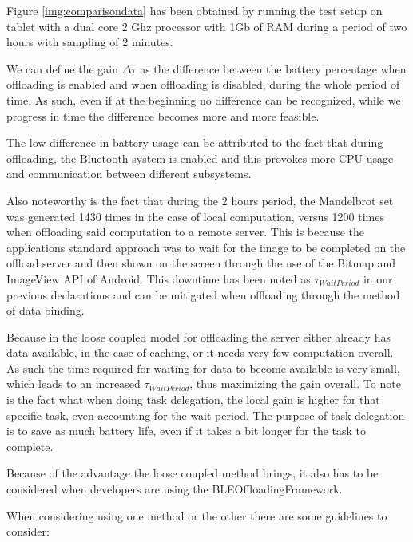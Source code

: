 
Figure \ref{img:comparisondata} has been obtained by running the test setup on tablet with a dual core 2 Ghz processor with 1Gb of RAM during a period of two hours with sampling of 2 minutes.

We can define the gain \(\Delta\tau\) as the difference between the battery percentage when offloading is enabled and when offloading is disabled, during the whole period of time. As such, even if at the beginning no difference can be recognized, while we progress in time the difference becomes more and more feasible.

The low difference in battery usage can be attributed to the fact that during offloading, the Bluetooth system is enabled and this provokes more CPU usage and communication between different subsystems.

Also noteworthy is the fact that during the 2 hours period, the Mandelbrot set was generated 1430 times in the case of local computation, versus 1200 times when offloading said computation to a remote server. This is because the applications standard approach was to wait for the image to be completed on the offload server and then shown on the screen through the use of the Bitmap and ImageView API of Android. This downtime has been noted as \(\tau_{WaitPeriod}\) in our previous declarations and can be mitigated when offloading through the method of data binding.

Because in the loose coupled model for offloading the server either already has data available, in the case of caching, or it needs very few computation overall. As such the time required for waiting for data to become available is very small, which leads to an increased \(\tau_{WaitPeriod}\), thus maximizing the gain overall. To note is the fact what when doing task delegation, the local gain is higher for that specific task, even accounting for the wait period. The purpose of task delegation is to save as much battery life, even if it takes a bit longer for the task to complete.

Because of the advantage the loose coupled method brings, it also has to be considered when developers are using the BLEOffloadingFramework. 

When considering using one method or the other there are some guidelines to consider:

